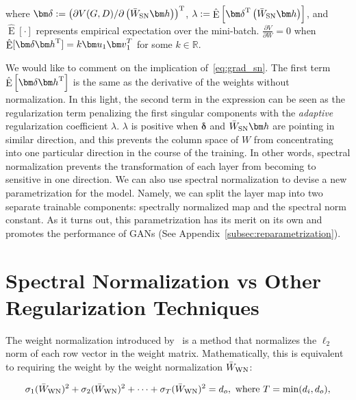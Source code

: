 where ${\bm \delta} := \left(\partial V(G,D) / \partial \left(\bar{W}_{\rm SN} {\bm h}\right)\right)^{\rm T}$, $\lambda:=\hat{\mathop{\mathrm{E}}}\left[{\bm \delta}^{\rm T} \left( \bar{W}_{\rm SN}{\bm h} \right)\right]$, and $\hat{\mathop{\mathrm{E}}}[\cdot]$ represents empirical expectation over the mini-batch.
$\frac{\partial V}{\partial W}=0$ when $\hat{\mathop{\mathrm{E}}}[{\bm \delta} {\bm h}^{\rm T}] = k{\bm u}_1 {\bm v}_1^T \label{eq:fixedpoint}$ for some $k\in \mathbb{R}$.

We would like to comment on the implication of~\eqref{eq:grad_sn}.
The first term $\hat{\mathop{\mathrm{E}}}\left[{\bm \delta} {\bm h}^{\rm T}\right]$ is the same as the derivative of the weights without normalization. In this light, the second term in the expression can be seen as the regularization term penalizing the first singular components with the \textit{adaptive} regularization coefficient $\lambda$.
$\lambda$ is positive when ${\bm \delta}$ and $\bar{W}_{\rm SN} {\bm h}$ are pointing in similar direction, and this prevents the column space of $W$ from concentrating into one particular direction in the course of the training. In other words, spectral normalization prevents the transformation of each layer from becoming to sensitive in one direction. We can also use spectral normalization to devise a new parametrization for the model. Namely, we can split the layer map into two separate trainable components: spectrally normalized map and the spectral norm constant. As it turns out, this parametrization has its merit on its own and promotes the performance of GANs (See Appendix~\ref{subsec:reparametrization}).

\section{Spectral Normalization vs Other Regularization Techniques}\label{sec:snvsothers}
The weight normalization introduced by~\cite{salimans2016weight} is a method that normalizes the $\ell_2$ norm of each row vector in the weight matrix. Mathematically, this is equivalent to requiring the weight by the weight normalization $\bar{W}_{\rm WN}$:

\begin{align}
	\sigma_1(\bar{W}_{\rm WN})^2 + \sigma_2(\bar{W}_{\rm WN})^2 + \cdots + \sigma_T(\bar{W}_{\rm WN})^2 = d_o,~{\rm where}~T=\min(d_i,d_o), \label{eq:svconstraint}
\end{align}

